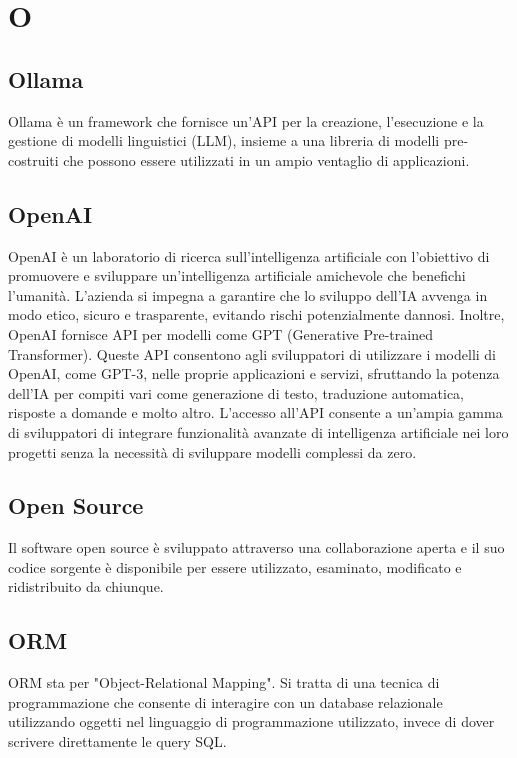 \chapter{O}

\section{Ollama}
Ollama è un framework che fornisce un’API per la creazione, l’esecuzione e la gestione di modelli linguistici (LLM), insieme a una libreria di modelli pre-costruiti che possono essere utilizzati in un ampio ventaglio di applicazioni.

\section{OpenAI}
OpenAI è un laboratorio di ricerca sull'intelligenza artificiale con l'obiettivo di promuovere e sviluppare un'intelligenza artificiale amichevole che benefichi l'umanità. L'azienda si impegna a garantire che lo sviluppo dell'IA avvenga in modo etico, sicuro e trasparente, evitando rischi potenzialmente dannosi.
Inoltre, OpenAI fornisce API per modelli come GPT (Generative Pre-trained Transformer). Queste API consentono agli sviluppatori di utilizzare i modelli di OpenAI, come GPT-3, nelle proprie applicazioni e servizi, sfruttando la potenza dell'IA per compiti vari come generazione di testo, traduzione automatica, risposte a domande e molto altro. L'accesso all'API consente a un'ampia gamma di sviluppatori di integrare funzionalità avanzate di intelligenza artificiale nei loro progetti senza la necessità di sviluppare modelli complessi da zero.

\section{Open Source}
Il software open source è sviluppato attraverso una collaborazione aperta e il suo codice sorgente è disponibile per essere utilizzato, esaminato, modificato e ridistribuito da chiunque. 

\section{ORM}\label{sec:Object-Relational Mapping}
ORM sta per "Object-Relational Mapping". Si tratta di una tecnica di programmazione che consente di interagire con un database relazionale utilizzando oggetti nel linguaggio di programmazione utilizzato, invece di dover scrivere direttamente le query SQL.
